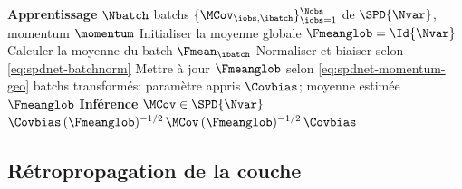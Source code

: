 \begin{figure}[p]
  \begin{center}
    \makebox[\textwidth][c]{}
  \end{center}
  \caption{%
  }
  \label{fig:spdnet-batchnorm}
\end{figure}

\begin{algorithm}[htb]
  \caption{Normalisation par batch pour \SPDnet}
  \label{algo:spdnet-batchnorm}
  \begin{algorithmic}[1]
    \Statex\hspace*{-\algorithmicindent}\textbf{Apprentissage}
    \Require $\Nbatch$ batchs $\{\MCov_{\iobs,\ibatch}\}_{\iobs=1}^{\Nobs}$ de $\SPD{\Nvar}$, momentum $\momentum$
    \State Initialiser la moyenne globale $\Fmeanglob=\Id{\Nvar}$
      \State Calculer la moyenne du batch $\Fmean_\ibatch$
      \State Normaliser et biaiser selon \cref{eq:spdnet-batchnorm}
      \State Mettre à jour $\Fmeanglob$ selon \cref{eq:spdnet-momentum-geo}
    \EndFor
    \Ensure batchs transformés; paramètre appris $\Covbias$; moyenne estimée $\Fmeanglob$
    \Statex\hspace*{-\algorithmicindent}\textbf{Inférence}
    \Require $\MCov\in\SPD{\Nvar}$
    \Ensure $\Covbias\,(\Fmeanglob)^{-1/2}\,\MCov\,(\Fmeanglob)^{-1/2}\,\Covbias$
  \end{algorithmic}
\end{algorithm}

\subsection{Rétropropagation de la couche}
\label{sec:spdnet-batchnorm-backprop}


